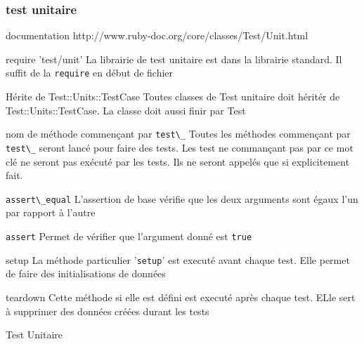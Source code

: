 \documentclass{beamer}
\begin{document}
\begin{frame}
  \frametitle{test unitaire}
  \begin{block}{documentation}
    http://www.ruby-doc.org/core/classes/Test/Unit.html
  \end{block}
  \begin{block}{require 'test/unit'}
    La librairie de test unitaire est dans la librairie standard. Il suffit de la \verb?require? en d\'ebut de fichier
  \end{block}
  \begin{block}{H\'erite de Test::Units::TestCase}
    Toutes classes de Test unitaire doit h\'erit\'er de Test::Units::TestCase. La classe doit aussi finir par Test
  \end{block}
  \begin{block}{nom de m\'ethode commençant par \verb?test\_?}
    Toutes les m\'ethodes commençant par \verb?test\_? seront lanc\'e pour faire des tests. Les test ne commançant pas par ce mot cl\'e ne seront pas ex\'ecut\'e par les tests. Ils ne seront appel\'es que si explicitement fait.
  \end{block}
\end{frame}

\begin{frame}
  \begin{block}{\verb?assert\_equal?}
    L'assertion de base v\'erifie que les deux arguments sont \'egaux l'un par rapport à l'autre
  \end{block}
  \begin{block}{\verb?assert?}
    Permet de v\'erifier que l'argument donn\'e est \verb?true?
  \end{block}
  \begin{block}{setup}
    La m\'ethode particulier '\verb?setup?' est execut\'e avant chaque test. Elle permet de faire des initialisations de donn\'ees
  \end{block}
  \begin{block}{teardown}
    Cette m\'ethode si elle est d\'efini est execut\'e après chaque test. ELle sert à supprimer des donn\'ees cr\'e\'ees durant les tests
  \end{block}
\end{frame}

\begin{frame}
  \begin{beamerboxesrounded}{Test Unitaire}
    
  \end{beamerboxesrounded}
\end{frame}
\end{document}
